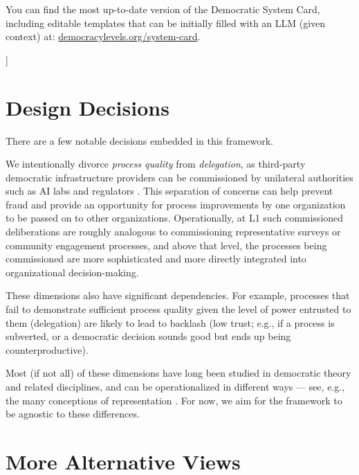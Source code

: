 \documentclass{article}
\begin{document}
    \vspace{4pt}
    
    You can find the most up-to-date version of the Democratic System Card, including editable templates that can be initially filled with an LLM (given context) at: \href{https://democracylevels.org/system-card}{democracylevels.org/system-card}.

    \thickbar
    \vspace{14pt}
]

    




\section{Design Decisions}

    There are a few notable decisions embedded in this framework. 

    We intentionally divorce \textit{process quality} from \textit{delegation}, as third-party democratic infrastructure providers can be commissioned by unilateral authorities such as AI labs and regulators \cite{chang2024,ovadya2023a,broxmeyer2024,rsa2019,anthropic2023}. This separation of concerns can help prevent fraud and provide an opportunity for process improvements by one organization to be passed on to other organizations. Operationally, at L1 such commissioned deliberations are roughly analogous to commissioning representative surveys or community engagement processes, and above that level, the processes being commissioned are more sophisticated and more directly integrated into organizational decision-making. 
    
    These dimensions also have significant dependencies. For example, processes that fail to demonstrate sufficient process quality given the level of power entrusted to them (delegation) are likely to lead to backlash (low trust; e.g., if a process is subverted, or a democratic decision sounds good but ends up being counterproductive). 

    Most (if not all) of these dimensions have long been studied in democratic theory and related disciplines, and can be operationalized in different ways --- see, e.g., the many conceptions of representation \cite{dovi2018}. For now, we aim for the framework to be agnostic to these differences.

\section{More Alternative Views}
\label{appendix:alternative-views}
\end{document}
